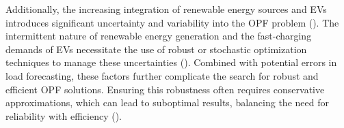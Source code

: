 Additionally, the increasing integration of renewable energy sources and \gls{EV}s introduces significant uncertainty and variability into the \gls{OPF} problem (\cite{jabr2014robust}). The intermittent nature of renewable energy generation and the fast-charging demands of \gls{EV}s necessitate the use of robust or stochastic optimization techniques to manage these uncertainties (\cite{wang2021grid}). Combined with potential errors in load forecasting, these factors further complicate the search for robust and efficient \gls{OPF} solutions. Ensuring this robustness often requires conservative approximations, which can lead to suboptimal results, balancing the need for reliability with efficiency (\cite{ding2016adjustable}).


